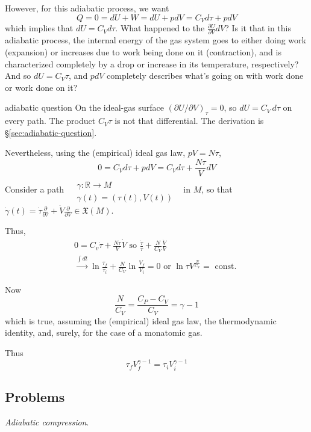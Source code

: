 However, for this adiabatic process, we want
\[
Q = 0 = dU + W = dU + pdV = C_V d\tau + pdV
\]
which implies that $dU = C_V d\tau$.  What happened to the $\frac{ \partial U}{ \partial V} dV$? Is it that in this adiabatic process, the internal energy of the gas system goes to either doing work (expansion) or increases due to work being done on it (contraction), and is characterized completely by a drop or increase in its temperature, respectively?  And so $dU = C_V \tau$, and $pdV$ completely describes what's going on with work done or work done on it?
\begin{correction}{adiabatic question}
On the ideal-gas surface $(\partial U/\partial V)_{\tau} = 0$, so $dU = C_V\, d\tau$ on every path.
The product $C_V\tau$ is not that differential.
The derivation is \S\ref{sec:adiabatic-question}.
\end{correction}

Nevertheless, using the (empirical) ideal gas law, $pV = N\tau$, 
\[
0 = C_V d\tau + pdV = C_V d\tau + \frac{N\tau}{V} dV
\]
Consider a path $\begin{aligned} & \quad \\
  & \gamma : \mathbb{R} \to M \\ 
  & \gamma(t) = (\tau(t), V(t)) \end{aligned}$ \quad \, in $M$, so that $\dot{\gamma}(t) = \dot{\tau} \frac{ \partial }{ \partial \tau } + \dot{V} \frac{ \partial }{ \partial V} \in \mathfrak{X}(M)$.  

Thus, 
\[
\begin{gathered}
  0 = C_v \dot{\tau} + \frac{N \tau}{V} \dot{V} \text{ so } \frac{ \dot{\tau}}{\tau} + \frac{N}{C_V} \frac{ \dot{V}}{V} \\
  \xrightarrow{ \int dt } \ln{ \frac{ \tau_f}{ \tau_i } } + \frac{N}{C_V} \ln{ \frac{V_f}{ V_i } } = 0 \text{ or } \ln{\tau V^{\frac{N}{C_V}} } = \text{ const. }
\end{gathered}
\]

Now
\[
\frac{N}{C_V} = \frac{C_P - C_V}{ C_V} = \gamma -1 
\]
which is true, assuming the (empirical) ideal gas law, the thermodynamic identity, and, surely, for the case of a monatomic gas.  

Thus
\[
\tau_f V_f^{\gamma-1} = \tau_i V_i^{\gamma -1}
\]

\subsection*{Problems}

 \emph{Adiabatic compression}. 

